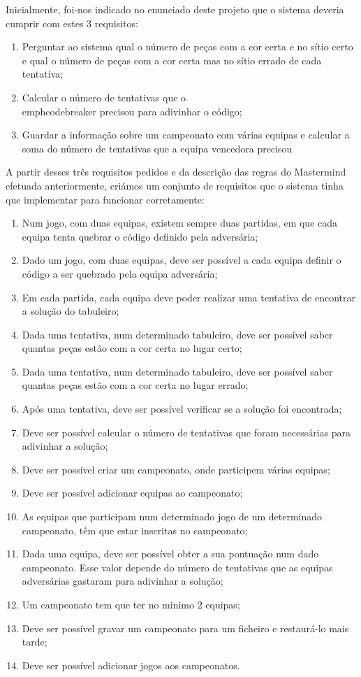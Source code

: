 
Inicialmente, foi-nos indicado no enunciado deste projeto que o
sistema deveria cumprir com estes 3 requisitos:

\begin{enumerate}
\item Perguntar ao sistema qual o número de peças com a cor certa e no
  sítio certo e qual o número de peças com a cor certa mas no sítio
  errado de cada tentativa;
\item Calcular o número de tentativas que o \\emph{codebreaker} precisou para
  adivinhar o código;
\item Guardar a informação sobre um campeonato com várias equipas e
  calcular a soma do número de tentativas que a equipa vencedora precisou
\end{enumerate}

A partir desses três requisitos pedidos e da descrição das regras do
Mastermind efetuada anteriormente, criámos um conjunto de requisitos
que o sistema tinha que implementar para funcionar corretamente:

\begin{enumerate}
\item Num jogo, com duas equipas, existem sempre duas partidas, em que
  cada equipa tenta quebrar o código definido pela adversária;
\item Dado um jogo, com duas equipas, deve ser possível a cada equipa
  definir o código a ser quebrado pela equipa adversária;
\item Em cada partida, cada equipa deve poder realizar uma tentativa
  de encontrar a solução do tabuleiro;
\item Dada uma tentativa, num determinado tabuleiro, deve ser possível
  saber quantas peças estão com a cor certa no lugar certo;
\item Dada uma tentativa, num determinado tabuleiro, deve ser possível
  saber quantas peças estão com a cor certa no lugar errado;
\item Após uma tentativa, deve ser possível verificar se a solução foi
  encontrada;
\item Deve ser possível calcular o número de tentativas que foram
  necessárias para adivinhar a solução;
\item Deve ser possível criar um campeonato, onde participem várias
  equipas;
\item Deve ser possível adicionar equipas ao campeonato;
\item As equipas que participam num determinado jogo de um determinado
  campeonato, têm que estar inscritas no campeonato;
\item Dada uma equipa, deve ser possível obter a sua pontuação num
  dado campeonato. Esse valor depende do número de tentativas que as
  equipas adversárias gastaram para adivinhar a solução;
\item Um campeonato tem que ter no minimo 2 equipas;
\item Deve ser possível gravar um campeonato para um ficheiro e
  restaurá-lo mais tarde;
\item Deve ser possível adicionar jogos aos campeonatos.
\end{enumerate}


